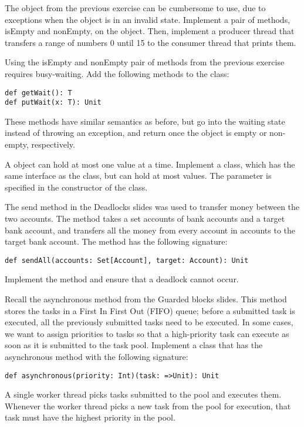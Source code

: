\documentclass[11pt]{article}
\begin{document}
\begin{myExercise}The  object from the previous exercise can be cumbersome to use, due to exceptions when the  object is in an invalid state. Implement a pair of methods, isEmpty and nonEmpty, on the  object. Then, implement a producer thread that transfers a range of numbers 0 until 15 to the consumer thread that prints them.
\end{myExercise}

\begin{myExercise}Using the isEmpty and nonEmpty pair of methods from the previous exercise requires busy-waiting. Add the following methods to the  class:
\begin{lstlisting}
def getWait(): T
def putWait(x: T): Unit
\end{lstlisting}
These methods have similar semantics as before, but go into the waiting state instead of throwing an exception, and return once the  object is empty or non-empty, respectively.
\end{myExercise}

\begin{myExercise}A  object can hold at most one value at a time. Implement a  class, which has the same interface as the  class, but can hold at most  values. The  parameter is specified in the constructor of the  class.
\end{myExercise}

\begin{myExercise}The send method in the Deadlocks slides was used to transfer money between the two accounts. The  method takes a set accounts of bank accounts and a target bank account, and transfers all the money from every account in accounts to the target bank account. The  method has the following signature:
\begin{lstlisting}
def sendAll(accounts: Set[Account], target: Account): Unit
\end{lstlisting}
Implement the  method and ensure that a deadlock cannot occur.
\end{myExercise}

\begin{myExercise}Recall the asynchronous method from the Guarded blocks slides. This method stores the tasks in a First In First Out (FIFO) queue; before a submitted task is executed, all the previously submitted tasks need to be executed. In some cases, we want to assign priorities to tasks so that a high-priority task can execute as soon as it is submitted to the task pool. Implement a  class that has the asynchronous method with the following signature:
\begin{lstlisting}
def asynchronous(priority: Int)(task: =>Unit): Unit
\end{lstlisting}
A single worker thread picks tasks submitted to the pool and executes them. Whenever the worker thread picks a new task from the pool for execution, that task must have the highest priority in the pool.
\end{myExercise}
\end{document}
